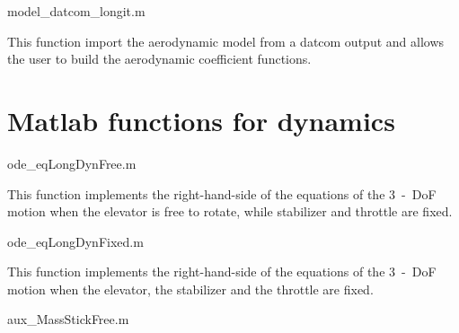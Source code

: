 \documentclass[[12pt,twoside]{book}
\begin{document}
    
    
    
    
    
    
    {model_datcom_longit.m} 
    
    This function import the aerodynamic model from a datcom output and allows the user to build the aerodynamic coefficient functions.



















\chapter%
   [Matlab functions for dynamics]%
   {Matlab functions for dynamics}
\label{chap:Appendix:Matlab:Dynamics}
%
    {ode_eqLongDynFree.m}
    
    This function implements the right-hand-side of the equations of the 3~-~DoF motion when the elevator is free to rotate, while stabilizer and throttle are fixed. 
    
    
    
    
    
    {ode_eqLongDynFixed.m}
    
    This function implements the right-hand-side of the equations of the 3~-~DoF motion when the elevator, the stabilizer and the throttle are fixed. 
    
    
    
   
   
   
    {aux_MassStickFree.m} 
    
\end{document}
